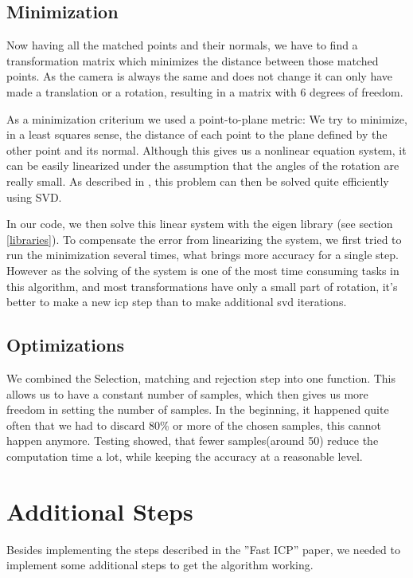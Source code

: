 \documentclass[10pt,twocolumn,letterpaper]{article}
\begin{document}
\subsection{Minimization}
\label{minimization}
Now having all the matched points and their normals, we have to find a transformation matrix which minimizes the distance between those matched points.
As the camera is always the same and does not change it can only have made a translation or a rotation, resulting in a matrix with 6 degrees of freedom.

As a minimization criterium we used a point-to-plane metric: We try to minimize, in a least squares sense, the distance of each point to the plane
defined by the other point and its normal. Although this gives us a nonlinear equation system, it can be easily linearized under the assumption
that the angles of the rotation are really small. As described in \cite{ptp}, this problem can then be solved quite efficiently using SVD.

In our code, we then solve this linear system with the eigen library (see section \ref{libraries}).
To compensate the error from linearizing the system, we first tried to run the minimization several times, what brings more accuracy for a single step. 
However as the solving of the system is one of the most time consuming tasks in this algorithm,
and most transformations have only a small part of rotation, it's better to make a new icp step than to make additional svd iterations.

\subsection{Optimizations}
We combined the Selection, matching and rejection step into one function. This allows us to have a constant number of samples,
which then gives us more freedom in setting the number of samples. In the beginning, it happened quite often that we had to discard
80\% or more of the chosen samples, this cannot happen anymore. Testing showed, that fewer samples(around 50) reduce the computation
time a lot, while keeping the accuracy at a reasonable level.

\section{Additional Steps}
Besides implementing the steps described in the ''Fast ICP'' \cite{fasticp} paper,
we needed to implement some additional steps to get the algorithm working.
\end{document}

